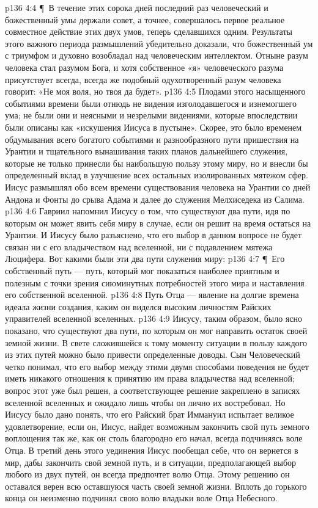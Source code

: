 \vs p136 4:4 \P\ В течение этих сорока дней последний раз человеческий и божественный умы держали совет, а точнее, совершалось первое реальное совместное действие этих двух умов, теперь сделавшихся одним. Результаты этого важного периода размышлений убедительно доказали, что божественный ум с триумфом и духовно возобладал над человеческим интеллектом. Отныне разум человека стал разумом Бога, и хотя собственное «я» человеческого разума присутствует всегда, всегда же подобный одухотворенный разум человека говорит: «Не моя воля, но твоя да будет».
\vs p136 4:5 Плодами этого насыщенного событиями времени были отнюдь не видения изголодавшегося и изнемогшего ума; не были они и неясными и незрелыми видениями, которые впоследствии были описаны как «искушения Иисуса в пустыне». Скорее, это было временем обдумывания всего богатого событиями и разнообразного пути пришествия на Урантии и тщательного вынашивания таких планов дальнейшего служения, которые не только принесли бы наибольшую пользу этому миру, но и внесли бы определенный вклад в улучшение всех остальных изолированных мятежом сфер. Иисус размышлял обо всем времени существования человека на Урантии со дней Андона и Фонты до срыва Адама и далее до служения Мелхиседека из Салима.
\vs p136 4:6 Гавриил напомнил Иисусу о том, что существуют два пути, идя по которым он может явить себя миру в случае, если он решит на время остаться на Урантии. И Иисусу было разъяснено, что его выбор в данном вопросе не будет связан ни с его владычеством над вселенной, ни с подавлением мятежа Люцифера. Вот какими были эти два пути служения миру:
\vs p136 4:7 \P\ \bibnobreakspace Его собственный путь --- путь, который мог показаться наиболее приятным и полезным с точки зрения сиюминутных потребностей этого мира и наставления его собственной вселенной.
\vs p136 4:8 \bibnobreakspace Путь Отца --- явление на долгие времена идеала жизни создания, каким он виделся высоким личностям Райских управителей вселенной вселенных.
\vs p136 4:9 Иисусу, таким образом, было ясно показано, что существуют два пути, по которым он мог направить остаток своей земной жизни. В свете сложившейся к тому моменту ситуации в пользу каждого из этих путей можно было привести определенные доводы. Сын Человеческий четко понимал, что его выбор между этими двумя способами поведения не будет иметь никакого отношения к принятию им права владычества над вселенной; вопрос этот уже был решен, а соответствующее решение закреплено в записях вселенной вселенных и ожидало лишь чтобы он лично их востребовал. Но Иисусу было дано понять, что его Райский брат Иммануил испытает великое удовлетворение, если он, Иисус, найдет возможным закончить свой путь земного воплощения так же, как он столь благородно его начал, всегда подчиняясь воле Отца. В третий день этого уединения Иисус пообещал себе, что он вернется в мир, дабы закончить свой земной путь, и в ситуации, предполагающей выбор любого из двух путей, он всегда предпочтет волю Отца. Этому решению он оставался верен всю оставшуюся часть своей земной жизни. Вплоть до горького конца он неизменно подчинял свою волю владыки воле Отца Небесного.
